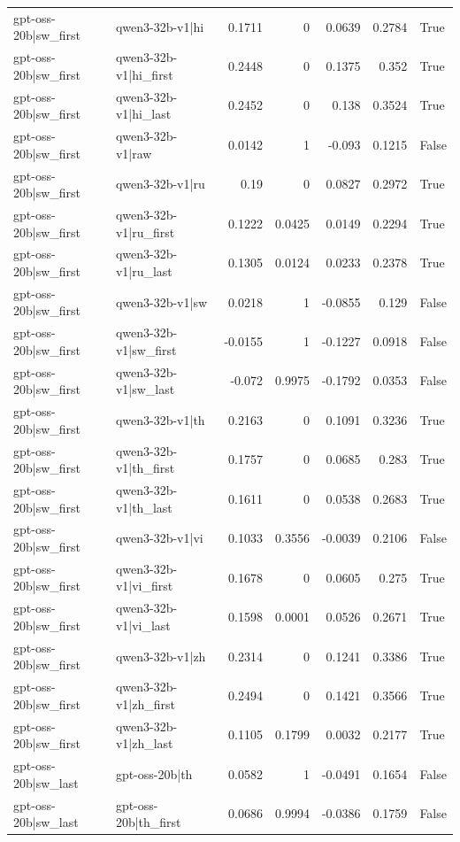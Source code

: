 \begin{table}
\begin{tabular}{l l r r r r l}
gpt-oss-20b|sw_first & qwen3-32b-v1|hi & 0.1711 & 0 & 0.0639 & 0.2784 & True \\
gpt-oss-20b|sw_first & qwen3-32b-v1|hi_first & 0.2448 & 0 & 0.1375 & 0.352 & True \\
gpt-oss-20b|sw_first & qwen3-32b-v1|hi_last & 0.2452 & 0 & 0.138 & 0.3524 & True \\
gpt-oss-20b|sw_first & qwen3-32b-v1|raw & 0.0142 & 1 & -0.093 & 0.1215 & False \\
gpt-oss-20b|sw_first & qwen3-32b-v1|ru & 0.19 & 0 & 0.0827 & 0.2972 & True \\
gpt-oss-20b|sw_first & qwen3-32b-v1|ru_first & 0.1222 & 0.0425 & 0.0149 & 0.2294 & True \\
gpt-oss-20b|sw_first & qwen3-32b-v1|ru_last & 0.1305 & 0.0124 & 0.0233 & 0.2378 & True \\
gpt-oss-20b|sw_first & qwen3-32b-v1|sw & 0.0218 & 1 & -0.0855 & 0.129 & False \\
gpt-oss-20b|sw_first & qwen3-32b-v1|sw_first & -0.0155 & 1 & -0.1227 & 0.0918 & False \\
gpt-oss-20b|sw_first & qwen3-32b-v1|sw_last & -0.072 & 0.9975 & -0.1792 & 0.0353 & False \\
gpt-oss-20b|sw_first & qwen3-32b-v1|th & 0.2163 & 0 & 0.1091 & 0.3236 & True \\
gpt-oss-20b|sw_first & qwen3-32b-v1|th_first & 0.1757 & 0 & 0.0685 & 0.283 & True \\
gpt-oss-20b|sw_first & qwen3-32b-v1|th_last & 0.1611 & 0 & 0.0538 & 0.2683 & True \\
gpt-oss-20b|sw_first & qwen3-32b-v1|vi & 0.1033 & 0.3556 & -0.0039 & 0.2106 & False \\
gpt-oss-20b|sw_first & qwen3-32b-v1|vi_first & 0.1678 & 0 & 0.0605 & 0.275 & True \\
gpt-oss-20b|sw_first & qwen3-32b-v1|vi_last & 0.1598 & 0.0001 & 0.0526 & 0.2671 & True \\
gpt-oss-20b|sw_first & qwen3-32b-v1|zh & 0.2314 & 0 & 0.1241 & 0.3386 & True \\
gpt-oss-20b|sw_first & qwen3-32b-v1|zh_first & 0.2494 & 0 & 0.1421 & 0.3566 & True \\
gpt-oss-20b|sw_first & qwen3-32b-v1|zh_last & 0.1105 & 0.1799 & 0.0032 & 0.2177 & True \\
gpt-oss-20b|sw_last & gpt-oss-20b|th & 0.0582 & 1 & -0.0491 & 0.1654 & False \\
gpt-oss-20b|sw_last & gpt-oss-20b|th_first & 0.0686 & 0.9994 & -0.0386 & 0.1759 & False \\

\end{tabular}
\end{table}

